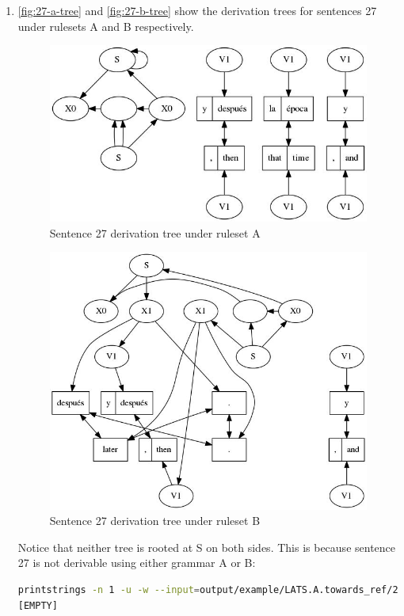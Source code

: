 \documentclass[a4paper,oneside,reqno]{amsart}
\begin{document}
\begin{enumerate}[label=\arabic*.]
  \item
    \autoref{fig:27-a-tree} and \autoref{fig:27-b-tree} show the derivation
    trees for sentences 27 under rulesets A and B respectively.
    \begin{figure}[H]
      \begin{center}
        \includegraphics[scale=0.5]{../output/tree27Advn1.jpg}
      \end{center}
      \caption{Sentence 27 derivation tree under ruleset A}
      \label{fig:27-a-tree}
    \end{figure}
    \begin{figure}[H]
      \begin{center}
        \includegraphics[scale=0.5]{../output/tree27Bdvn1.jpg}
      \end{center}
      \caption{Sentence 27 derivation tree under ruleset B}
      \label{fig:27-b-tree}
    \end{figure}
    Notice that neither tree is rooted at S on both sides. This is because
    sentence 27 is not derivable using either grammar A or B:
    \begin{lstlisting}[language=bash]
printstrings -n 1 -u -w --input=output/example/LATS.A.towards_ref/27.fst.gz 2>/dev/null
[EMPTY]


\end{lstlisting}
\end{enumerate}
\end{document}
